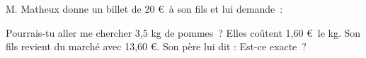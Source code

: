 \documentclass[exercice]{thedocument}%
\begin{document}
%
M. Matheux donne un billet de 20 \euro\ à son fils et lui demande~:\par\noindent\guillemets
{Pourrais-tu aller me chercher 3,5 kg de pommes~? Elles coûtent 1,60
\euro\ le kg.}\vskip5pt Son fils revient du marché avec 13,60 \euro.\vskip5pt
Son père lui dit : 
\vskip5pt Est-ce exacte~?
\end{document}
